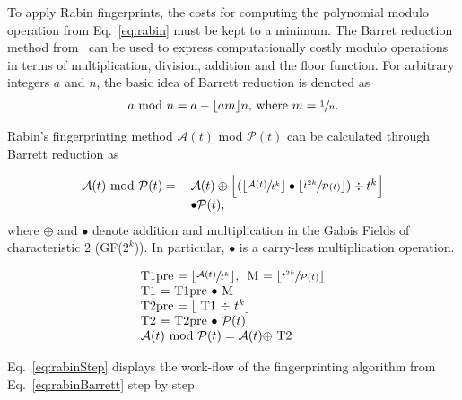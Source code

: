 \documentclass[10pt, conference, compsocconf]{IEEEtran}
\begin{document}
To apply Rabin fingerprints, the costs for computing the
polynomial modulo operation from Eq.~\eqref{eq:rabin} must
be kept to a minimum. 
The Barret reduction method from~\cite{Barrett87} can be used
to express computationally costly modulo operations
in terms of multiplication, division, addition and the
floor function.
For arbitrary integers $a$ and $n$, the basic idea of Barrett reduction is
denoted as
\begin{equation}
\centering
\begin{tabular}{c}
    $a$ mod $n=a-\lfloor am\rfloor n$, where $m=\sfrac{1}{n}$. \\
\end{tabular}
\label{eq:barret}
\end{equation}


Rabin's fingerprinting method $\mathcal{A}(t)$
mod $\mathcal{P}(t)$ can be calculated through Barrett reduction as

\begin{equation}
\centering
\begin{tabular}{ll}
    $\mathcal{A}(t)$ mod $\mathcal{P}(t)=$&$\mathcal{A}(t)\oplus
    \Big\lfloor (\lfloor\sfrac{\mathcal{A}(t)}{t^k}\rfloor\bullet
    \lfloor\sfrac{t^{2k}}{\mathcal{P}(t)}\rfloor)\div{t^k}\Big\rfloor$\\
    &$\bullet\mathcal{P}(t)$,
\end{tabular}
\label{eq:rabinBarrett}
\end{equation}
where
$\oplus$ and $\bullet$ denote 
addition and multiplication in the Galois Fields of
characteristic 2 (GF($2^k$)).
In particular, $\bullet$ is
a carry-less multiplication operation.

\begin{equation}
\centering
\begin{tabular}{l}
    T1pre~$=\lfloor\sfrac{\mathcal{A}(t)}{t^k}\rfloor$,
    ~M~$=\lfloor\sfrac{t^{2k}}{\mathcal{P}(t)}\rfloor$\\
    T1~$=$~T1pre$~\bullet~$M\\
    T2pre~$=\lfloor$~T1$~\div~t^k\rfloor$\\
    T2~$=~$T2pre$~\bullet~\mathcal{P}(t)$\\
    $\mathcal{A}(t)$~mod~$\mathcal{P}(t)=\mathcal{A}(t)\oplus~$T2
\end{tabular}
\label{eq:rabinStep}
\end{equation}

Eq.~\eqref{eq:rabinStep} displays the work-flow of the fingerprinting
algorithm from Eq.~\eqref{eq:rabinBarrett} step by step.
\end{document}
